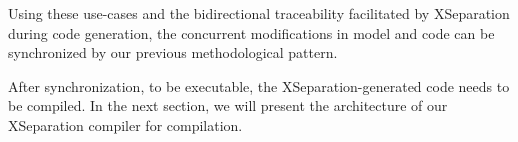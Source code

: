 Using these use-cases and the bidirectional traceability facilitated by XSeparation during code generation, the concurrent modifications in model and code can be synchronized by our previous methodological pattern.

After synchronization, to be executable, the XSeparation-generated code needs to be compiled.
In the next section, we will present the architecture of our XSeparation compiler for compilation. 

%

%
%
